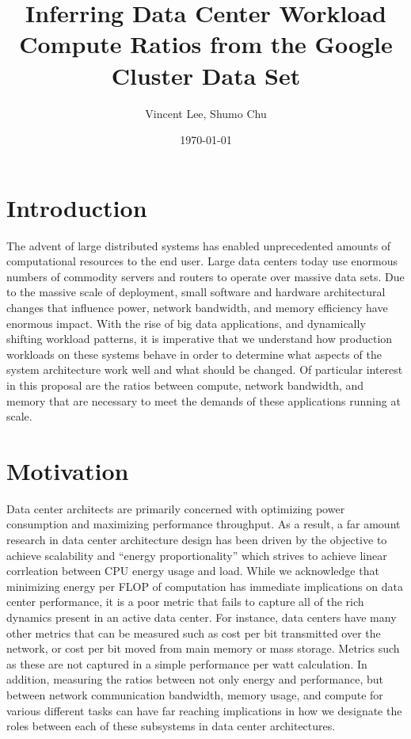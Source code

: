 \documentclass{article}
\begin{document}
\title{Inferring Data Center Workload Compute Ratios from the Google Cluster Data Set}
\author{Vincent Lee, Shumo Chu}
\date{\today}

\maketitle


\section{Introduction}

The advent of large distributed systems has enabled unprecedented amounts of computational resources to the end user.
Large data centers today use enormous numbers of commodity servers and routers to operate over massive data sets.
Due to the massive scale of deployment, small software and hardware architectural changes that influence power, network bandwidth, and memory efficiency have enormous impact.
With the rise of big data applications, and dynamically shifting workload patterns, it is imperative that we understand how production workloads on these systems behave in order to determine what aspects of the system architecture work well and what should be changed.
Of particular interest in this proposal are the ratios between compute, network bandwidth, and memory that are necessary to meet the demands of these applications running at scale.


\section{Motivation}

Data center architects are primarily concerned with optimizing power consumption and maximizing performance throughput.
As a result, a far amount research in data center architecture design has been driven by the objective to achieve scalability and ``energy proportionality'' which strives to achieve linear corrleation between CPU energy usage and load.
While we acknowledge that minimizing energy per FLOP of computation has immediate implications on data center performance, it is a poor metric that fails to capture all of the rich dynamics present in an active data center.
For instance, data centers have many other metrics that can be measured such as cost per bit transmitted over the network, or cost per bit moved from main memory or mass storage.
Metrics such as these are not captured in a simple performance per watt calculation.
In addition, measuring the ratios between not only energy and performance, but between network communication bandwidth, memory usage, and compute for various different tasks can have far reaching implications in how we designate the roles between each of these subsystems in data center architectures.
\end{document}
